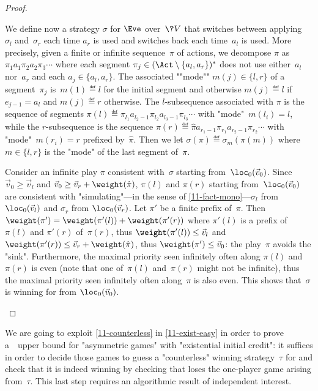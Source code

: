 \begin{proof}
  \begin{scope}
    We define now a strategy $\sigma$ for $\Eve$ over~$\?V$ that
    switches between applying~$\sigma_l$ and~$\sigma_r$ each time
    $a_r$ is used and switches back each time~$a_l$ is used.  More
    precisely, given a finite or infinite sequence~$\pi$ of actions,
    we decompose $\pi$ as $\pi_1 a_1 \pi_2 a_2 \pi_3\cdots$ where each
    segment $\pi_j\in(\Act\setminus\{a_l,a_r\})^\ast$ does not use
    either~$a_l$ nor~$a_r$ and each $a_j\in\{a_l,a_r\}$.  The
    associated ""mode"" $m(j)\in\{l,r\}$ of a segment~$\pi_j$
    is~$m(1)\eqdef l$ for the initial segment and otherwise
    $m(j)\eqdef l$ if $e_{j-1}=a_l$ and $m(j)\eqdef r$ otherwise.  The
    $l$-subsequence associated with $\pi$ is the sequence of segments
    $\pi(l)\eqdef\pi_{l_1}a_{l_2-1}\pi_{l_2}a_{l_3-1}\pi_{l_3}\cdots$
    with "mode"~$m(l_i)=l$, while the $r$-subsequence is the sequence
    $\pi(r)\eqdef\hat\pi a_{r_1-1}\pi_{r_1}a_{r_2-1}\pi_{r_2}\cdots$
    with "mode"~$m(r_i)=r$ prefixed by~$\hat\pi$.  Then we let
    $\sigma(\pi)\eqdef\sigma_{m}(\pi(m))$ where $m\in\{l,r\}$ is the
    "mode" of the last segment of~$\pi$.

    Consider an infinite play $\pi$ consistent with~$\sigma$ starting
    from~$\loc_0(\vec v_0)$.  Since $\vec v_0\geq\vec v_l$ and
    $\vec v_0\geq \vec v_r+\weight(\hat\pi)$, $\pi(l)$ and $\pi(r)$
    starting from~$\loc_0(\vec v_0)$ are consistent with
    "simulating"---in the sense of \cref{11-fact-mono}---$\sigma_l$
    from $\loc_0(\vec v_l)$ and $\sigma_r$ from $\loc_0(\vec v_r)$.
    Let $\pi'$ be a finite prefix of~$\pi$.  Then
    $\weight(\pi')=\weight(\pi'(l))+\weight(\pi'(r))$ where $\pi'(l)$
    is a prefix of~$\pi(l)$ and $\pi'(r)$ of~$\pi(r)$, thus
    $\weight(\pi'(l))\leq\vec v_l$ and
    $\weight(\pi'(r))\leq\vec v_r+\weight(\hat\pi)$, thus
    $\weight(\pi')\leq\vec v_0$: the play~$\pi$ avoids the "sink".
    Furthermore, the maximal priority seen infinitely often along
    $\pi(l)$ and $\pi(r)$ is even (note that one of~$\pi(l)$
    and~$\pi(r)$ might not be infinite), thus the maximal priority
    seen infinitely often along~$\pi$ is also even.  This shows
    that~$\sigma$ is winning for \Eve from $\loc_0(\vec v_0)$.
  \end{scope}
\end{proof}

We are going to exploit \cref{11-counterless} in \cref{11-exist-easy}
in order to prove a~\coNP\ upper bound for "asymmetric games" with
"existential initial credit": it suffices in order to decide those
games to guess a "counterless" winning strategy~$\tau$ for \Adam and
check that it is indeed winning by checking that \Eve loses the
one-player game arising from~$\tau$.  This last step requires an
algorithmic result of independent interest.

